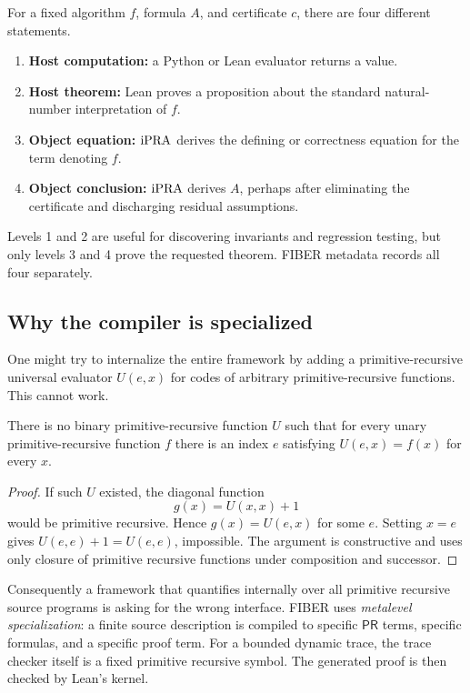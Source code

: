 For a fixed algorithm \(f\), formula \(A\), and certificate \(c\), there are
four different statements.

\begin{enumerate}
\item \textbf{Host computation:} a Python or Lean evaluator returns a value.
\item \textbf{Host theorem:} Lean proves a proposition about the standard
      natural-number interpretation of \(f\).
\item \textbf{Object equation:} \(\mathrm{iPRA}\) derives the defining or correctness
      equation for the term denoting \(f\).
\item \textbf{Object conclusion:} \(\mathrm{iPRA}\) derives \(A\), perhaps after
      eliminating the certificate and discharging residual assumptions.
\end{enumerate}

Levels 1 and 2 are useful for discovering invariants and regression testing,
but only levels 3 and 4 prove the requested theorem.  FIBER metadata records
all four separately.

\subsection{Why the compiler is specialized}

One might try to internalize the entire framework by adding a
primitive-recursive universal evaluator \(U(e,x)\) for codes of arbitrary
primitive-recursive functions.  This cannot work.

\begin{theorem}
There is no binary primitive-recursive function \(U\) such that for every
unary primitive-recursive function \(f\) there is an index \(e\) satisfying
\(U(e,x)=f(x)\) for every \(x\).
\end{theorem}

\begin{proof}
If such \(U\) existed, the diagonal function
\[
             g(x)=U(x,x)+1
\]
would be primitive recursive.  Hence \(g(x)=U(e,x)\) for some \(e\).  Setting
\(x=e\) gives \(U(e,e)+1=U(e,e)\), impossible.  The argument is constructive
and uses only closure of primitive recursive functions under composition and
successor.
\end{proof}

Consequently a framework that quantifies internally over all primitive
recursive source programs is asking for the wrong interface.  FIBER uses
\emph{metalevel specialization}: a finite source description is compiled to
specific \(\mathsf{PR}\) terms, specific formulas, and a specific proof term.
For a bounded dynamic trace, the trace checker itself is a fixed primitive
recursive symbol.  The generated proof is then checked by Lean's kernel.

